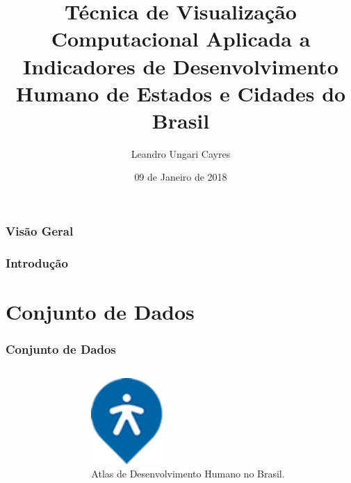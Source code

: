 \documentclass[aspectratio=169]{beamer}
\title[Projeto de Visualização]{Técnica de Visualização Computacional Aplicada a Indicadores de Desenvolvimento Humano de Estados e Cidades do Brasil}
\author[Leandro Ungari Cayres]{Leandro Ungari Cayres} %
\institute[UNESP] %
{
Universidade Estadual Paulista \\ %
\medskip
\textit{leandroungari@gmail.com} %
}
\date{09 de Janeiro de 2018} %
\begin{document}
\begin{frame}
\titlepage %
\end{frame}

\begin{frame}
\frametitle{Visão Geral}
\tableofcontents
\end{frame}

\begin{frame}
\frametitle{Introdução}
\justifying





\end{frame}

\section{Conjunto de Dados}
\begin{frame}
\frametitle{Conjunto de Dados}
\justifying

\begin{columns}
\begin{column}{0.7\textwidth}


\end{column}

\begin{column}{0.3\textwidth}

\begin{figure}
\centering
\includegraphics[width=0.3\textwidth]{images/atlas.png}
\caption{Atlas de Desenvolvimento Humano no Brasil.}
\end{figure}


\end{column}
\end{columns}


\end{frame}
\end{document}
